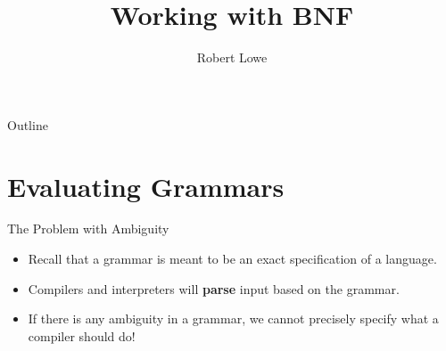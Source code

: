 \documentclass[handout]{beamer}
\title{Working with BNF}
\author{Robert Lowe}
\institute[Southeast Missouri State University] %
{
  Department of Computer Science\\
  Southeast Missouri State University
}
\date[]{}
\newenvironment{code}{%
 \VerbatimEnvironment
 \begin{adjustbox}{max width=\textwidth, max height=0.7\textheight}
 \begin{BVerbatim}
  }{
  \end{BVerbatim}
 \end{adjustbox}
}
\begin{document}
\begin{frame}
  \titlepage
\end{frame}

\begin{frame}{Outline}
  \tableofcontents
\end{frame}





\section{Evaluating Grammars}

\begin{frame}{The Problem with Ambiguity}
\begin{itemize}
    \item Recall that a grammar is meant to be an exact specification of a language.
    \item Compilers and interpreters will {\bf parse} input based on the grammar.
    \item If there is any ambiguity in a grammar, we cannot precisely specify what a compiler should do!
\end{itemize}
\end{frame}

\end{document}
